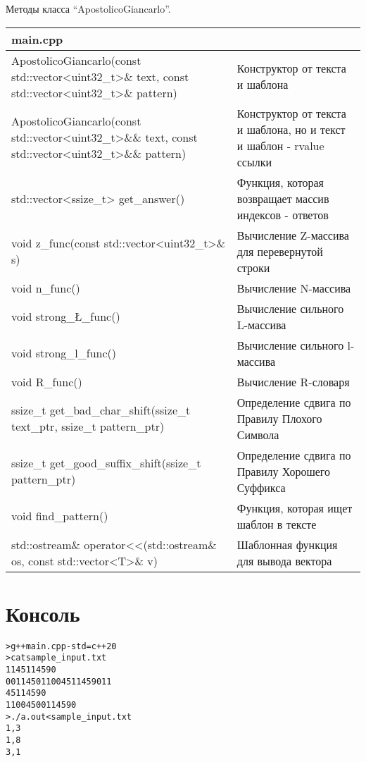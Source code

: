 Методы класса \enquote{ApostolicoGiancarlo}.
\begin{longtable}{|p{7.5cm}|p{7.5cm}|}
\hline
\rowcolor{lightgray}
\multicolumn{2}{|c|} {main.cpp}\\
\hline
ApostolicoGiancarlo(const std::vector<uint32\_t>\& text, const std::vector<uint32\_t>\& pattern)&Конструктор от текста и шаблона\\
\hline
ApostolicoGiancarlo(const std::vector<uint32\_t>\&\& text, const std::vector<uint32\_t>\&\& pattern)&Конструктор от текста и шаблона, но и текст и шаблон - rvalue ссылки\\
\hline
std::vector<ssize_t> get_answer()&Функция, которая возвращает массив индексов - ответов\\
\hline
void z\_func(const std::vector<uint32\_t>\& s)&Вычисление Z-массива для перевернутой строки\\
\hline
void n\_func()&Вычисление N-массива\\
\hline
void strong_\L\_func()&Вычисление сильного L-массива\\
\hline
void strong\_l\_func()&Вычисление сильного l-массива\\
\hline
void R_func()&Вычисление R-словаря\\
\hline
ssize\_t get\_bad\_char\_shift(ssize\_t text\_ptr, ssize\_t pattern\_ptr)&Определение сдвига по Правилу Плохого Символа\\
\hline
ssize\_t get\_good\_suffix\_shift(ssize\_t pattern\_ptr)&Определение сдвига по Правилу Хорошего Суффикса\\
\hline
void find\_pattern()&Функция, которая ищет шаблон в тексте\\
\hline
std::ostream\& operator<<(std::ostream\& os, const std::vector<T>\& v)&Шаблонная функция для вывода вектора\\
\hline

\end{longtable}

\pagebreak

\section{Консоль}
\begin{alltt}
> g++ main.cpp -std=c++20
> cat sample_input.txt
11 45 11 45 90
0011 45 011 0045 11 45 90    11
45 11 45 90
11 0045 0011 45 90%                                                                                                                                                                          
> ./a.out < sample_input.txt
1, 3
1, 8
3, 1 
\end{alltt}
\pagebreak

